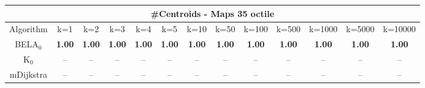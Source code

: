 \begin{tabular}{c|cccccccccccc}\toprule
\multicolumn{13}{c}{#Centroids - Maps 35 octile}\\ \midrule
Algorithm & k=1 & k=2 & k=3 & k=4 & k=5 & k=10 & k=50 & k=100 & k=500 & k=1000 & k=5000 & k=10000 \\ \midrule
BELA$_0$ & \textbf{1.00} & \textbf{1.00} & \textbf{1.00} & \textbf{1.00} & \textbf{1.00} & \textbf{1.00} & \textbf{1.00} & \textbf{1.00} & \textbf{1.00} & \textbf{1.00} & \textbf{1.00} & \textbf{1.00} \\
K$_0$ & -- & -- & -- & -- & -- & -- & -- & -- & -- & -- & -- & -- \\
mDijkstra & -- & -- & -- & -- & -- & -- & -- & -- & -- & -- & -- & -- \\ \bottomrule 
\end{tabular}
